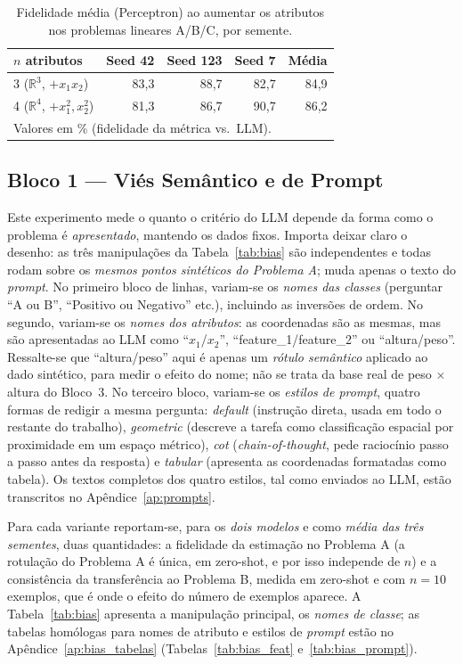 \documentclass[12pt,a4paper]{article}
\begin{document}
\begin{table}[ht]
\centering
\caption{Fidelidade média (Perceptron) ao aumentar os atributos nos problemas lineares
A/B/C, por semente.}
\label{tab:r3r4}
\begin{tabular}{lrrrr}
\toprule
\textbf{$n$ atributos} & \textbf{Seed 42} & \textbf{Seed 123} & \textbf{Seed 7} &
\textbf{Média} \\
\midrule
3 ($\mathbb{R}^3$, $+x_1 x_2$)          & 83,3 & 88,7 & 82,7 & 84,9 \\
4 ($\mathbb{R}^4$, $+x_1^2,x_2^2$)      & 81,3 & 86,7 & 90,7 & 86,2 \\
\bottomrule
\multicolumn{5}{l}{\footnotesize Valores em \% (fidelidade da métrica vs.\ LLM).}
\end{tabular}
\end{table}

\subsection{Bloco 1 — Viés Semântico e de Prompt}

Este experimento mede o quanto o critério do LLM depende da forma como o problema é
\emph{apresentado}, mantendo os dados fixos. Importa deixar claro o desenho: as três
manipulações da Tabela~\ref{tab:bias} são independentes e todas rodam sobre os
\emph{mesmos pontos sintéticos do Problema A}; muda apenas o texto do \emph{prompt}.
No primeiro bloco de linhas, variam-se os \emph{nomes das classes} (perguntar ``A ou B'',
``Positivo ou Negativo'' etc.), incluindo as inversões de ordem. No segundo, variam-se os
\emph{nomes dos atributos}:
as coordenadas são as mesmas, mas são apresentadas ao LLM como ``$x_1$/$x_2$'',
``feature\_1/feature\_2'' ou ``altura/peso''. Ressalte-se que ``altura/peso'' aqui é
apenas um \emph{rótulo semântico} aplicado ao dado sintético, para medir o efeito do nome;
não se trata da base real de peso $\times$ altura do Bloco~3. No terceiro bloco,
variam-se os \emph{estilos de prompt}, quatro formas de redigir a mesma pergunta:
\emph{default} (instrução direta, usada em todo o restante do trabalho), \emph{geometric}
(descreve a tarefa como classificação espacial por proximidade em um espaço métrico),
\emph{cot} (\emph{chain-of-thought}, pede raciocínio passo a passo antes da resposta) e
\emph{tabular} (apresenta as coordenadas formatadas como tabela). Os textos completos dos
quatro estilos, tal como enviados ao LLM, estão transcritos no
Apêndice~\ref{ap:prompts}.

Para cada variante reportam-se, para os \emph{dois modelos} e como \emph{média das três
sementes}, duas quantidades: a fidelidade da estimação no Problema A (a
rotulação do Problema A é única, em zero-shot, e por isso independe de $n$) e a
consistência da transferência ao Problema B, medida em zero-shot e com $n=10$ exemplos, que
é onde o efeito do número de exemplos aparece. A Tabela~\ref{tab:bias} apresenta a
manipulação principal, os \emph{nomes de classe}; as tabelas homólogas para nomes de
atributo e estilos de \emph{prompt} estão no Apêndice~\ref{ap:bias_tabelas}
(Tabelas~\ref{tab:bias_feat} e~\ref{tab:bias_prompt}).
\end{document}
